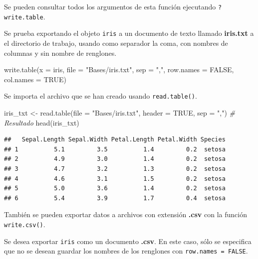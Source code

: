 \documentclass[
]{book}
\newenvironment{Shaded}{\begin{snugshade}}{\end{snugshade}}
\newcommand{\AttributeTok}[1]{\textcolor[rgb]{0.77,0.63,0.00}{#1}}
\newcommand{\CommentTok}[1]{\textcolor[rgb]{0.56,0.35,0.01}{\textit{#1}}}
\newcommand{\ConstantTok}[1]{\textcolor[rgb]{0.00,0.00,0.00}{#1}}
\newcommand{\FunctionTok}[1]{\textcolor[rgb]{0.00,0.00,0.00}{#1}}
\newcommand{\NormalTok}[1]{#1}
\newcommand{\OtherTok}[1]{\textcolor[rgb]{0.56,0.35,0.01}{#1}}
\newcommand{\StringTok}[1]{\textcolor[rgb]{0.31,0.60,0.02}{#1}}
\begin{document}
Se pueden consultar todos los argumentos de esta función ejecutando \texttt{?write.table}.

Se prueba exportando el objeto \texttt{iris} a un documento de texto llamado \textbf{iris.txt} a el directorio de trabajo, usando como separador la coma, con nombres de columnas y sin nombre de renglones.

\begin{Shaded}
\begin{Highlighting}[]
\FunctionTok{write.table}\NormalTok{(}\AttributeTok{x =}\NormalTok{ iris, }\AttributeTok{file =} \StringTok{"Bases/iris.txt"}\NormalTok{, }\AttributeTok{sep =} \StringTok{","}\NormalTok{, }
            \AttributeTok{row.names =} \ConstantTok{FALSE}\NormalTok{, }\AttributeTok{col.names =} \ConstantTok{TRUE}\NormalTok{)}
\end{Highlighting}
\end{Shaded}

Se importa el archivo que se han creado usando \texttt{read.table()}.

\begin{Shaded}
\begin{Highlighting}[]
\NormalTok{iris\_txt }\OtherTok{\textless{}{-}} \FunctionTok{read.table}\NormalTok{(}\AttributeTok{file =} \StringTok{"Bases/iris.txt"}\NormalTok{, }\AttributeTok{header =} \ConstantTok{TRUE}\NormalTok{, }\AttributeTok{sep =} \StringTok{","}\NormalTok{)}
\CommentTok{\# Resultado}
\FunctionTok{head}\NormalTok{(iris\_txt)}
\end{Highlighting}
\end{Shaded}

\begin{verbatim}
##   Sepal.Length Sepal.Width Petal.Length Petal.Width Species
## 1          5.1         3.5          1.4         0.2  setosa
## 2          4.9         3.0          1.4         0.2  setosa
## 3          4.7         3.2          1.3         0.2  setosa
## 4          4.6         3.1          1.5         0.2  setosa
## 5          5.0         3.6          1.4         0.2  setosa
## 6          5.4         3.9          1.7         0.4  setosa
\end{verbatim}

También se pueden exportar datos a archivos con extensión \textbf{.csv} con la función \texttt{write.csv()}.

Se desea exportar \texttt{iris} como un documento \textbf{.csv}. En este caso, sólo se especifica que no se desean guardar los nombres de los renglones con \texttt{row.names\ =\ FALSE}.
\end{document}
